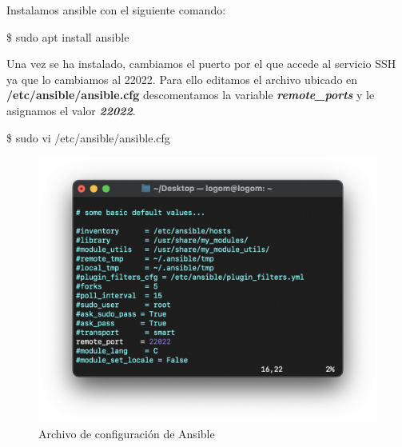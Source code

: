 Instalamos ansible con el siguiente comando:
\begin{tcolorbox}[colback=black!10, halign=left]
    \$ sudo apt install ansible
\end{tcolorbox}
Una vez se ha instalado, cambiamos el puerto por el que accede al servicio SSH ya que lo cambiamos al 22022. Para ello editamos
el archivo ubicado en \textbf{/etc/ansible/ansible.cfg} descomentamos la variable \textbf{\emph{remote\_ports}} y le asignamos el valor \textbf{\emph{22022}}.
    \begin{tcolorbox}[colback=black!10, halign=left]
        \$ sudo vi /etc/ansible/ansible.cfg
    \end{tcolorbox}
    \begin{figure}[H]
        \centering
        \includegraphics[scale=0.75]{images/ansible_cfg.png}
        \caption{Archivo de configuración de Ansible}
        \label{fig:ansible_cfg}
    \end{figure}

